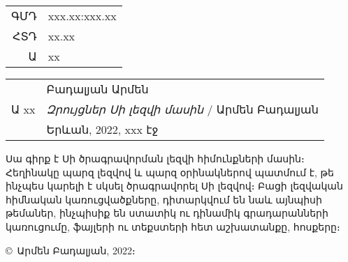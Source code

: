 \begin{titlepage}

\begingroup
\small\sffamily\linespread{1}
\begin{tabular}{rl}
ԳՄԴ & xxx.xx:xxx.xx \\
ՀՏԴ & xx.xx \\
Ա & xx \\
\end{tabular}
\endgroup

\vskip2cm

\begin{tabular}{rl}
     & Բադալյան Արմեն \\
Ա xx & \textsl{Զրույցներ Սի լեզվի մասին} / Արմեն Բադալյան \\
     & Երևան, 2022, xxx էջ
\end{tabular}

\begingroup\small
Սա գիրք է Սի ծրագրավորման լեզվի հիմունքների մասին։ Հեղինակը պարզ լեզվով
և պարզ օրինակներով պատմում է, թե ինչպես կարելի է սկսել ծրագրավորել Սի
լեզվով։ Բացի լեզվական հիմնական կառուցվածքները, դիտարկվում են նաև այնպիսի
թեմաներ, ինչպիսիք են ստատիկ ու դինամիկ գրադարանների կառուցումը, ֆայլերի
ու տեքստերի հետ աշխատանքը, հոսքերը։ 
\endgroup

\vfill
\textsf{\copyright\ Արմեն Բադալյան, 2022։}

\end{titlepage}

